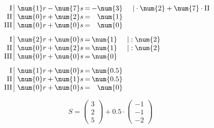 \begin{exercise}
\begin{minipage}[t]{0.49\linewidth}
    \begin{equation*}
    \setlength{\arraycolsep}{0.1em}%
    \begin{split}
    \\[1ex]&
    \begin{array}{r|rrrrrrrl}
      \text{I}{\,} & {\,} & \num{1}r & - & \num{7}s & = & -\num{3} & {\quad} & |\cdot\num{2}+\num{7}\cdot\text{II} \\
     \text{II}{\,} & {\,} & \num{0}r & + & \num{2}s & = &  \num{1} & {\quad} &                                     \\
    \text{III}{\,} & {\,} & \num{0}r & + & \num{0}s & = &  \num{0} & {\quad} &
    \end{array}
    \\[1ex]&
    \begin{array}{r|rrrrrrrl}
      \text{I}{\,} & {\,} & \num{2}r & + & \num{0}s & = & \num{1} & {\quad} & |:\num{2} \\
     \text{II}{\,} & {\,} & \num{0}r & + & \num{2}s & = & \num{1} & {\quad} & |:\num{2} \\
    \text{III}{\,} & {\,} & \num{0}r & + & \num{0}s & = & \num{0} & {\quad} &
    \end{array}
    \\[1ex]&
    \begin{array}{r|rrrrrrrl}
      \text{I}{\,} & {\,} & \num{1}r & + & \num{0}s & = & \num{0.5} & {\quad} &   \\
     \text{II}{\,} & {\,} & \num{0}r & + & \num{1}s & = & \num{0.5} & {\quad} &   \\
    \text{III}{\,} & {\,} & \num{0}r & + & \num{0}s & = &   \num{0} & {\quad} &
    \end{array}
    \end{split}
    \end{equation*}
    \end{minipage}
    \par
    \begin{equation*}
    S=
    \begin{pmatrix}
      \num{3} \\
      \num{2} \\
      \num{5}
    \end{pmatrix}
    +\num{0.5}\cdot
    \begin{pmatrix}
      -\num{1} \\
      -\num{1} \\
      -\num{2}
    \end{pmatrix}

\end{equation*}
\end{exercise}
